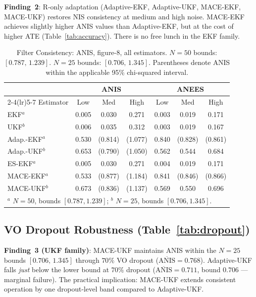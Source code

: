 \documentclass[letterpaper, 10pt, journal]{IEEEtran}
\begin{document}
\textbf{Finding~2}: R-only adaptation (Adaptive-EKF, Adaptive-UKF, MACE-EKF,
MACE-UKF) restores NIS consistency at medium and high noise. MACE-EKF achieves
slightly higher ANIS values than Adaptive-EKF, but at the cost of higher ATE
(Table~\ref{tab:accuracy}). There is no free lunch in the EKF family.

\begin{table}[t]
\caption{Filter Consistency: ANIS, figure-8, all estimators.
  $N=50$ bounds: $[0.787,\,1.239]$. $N=25$ bounds: $[0.706,\,1.345]$.
  Parentheses denote ANIS within the applicable 95\% chi-squared interval.}
\label{tab:consistency}
\centering\small
\begin{tabular}{lccc@{\quad}ccc}
\toprule
& \multicolumn{3}{c}{ANIS} & \multicolumn{3}{c}{ANEES}\\
\cmidrule(lr){2-4}\cmidrule(lr){5-7}
Estimator & Low & Med & High & Low & Med & High\\
\midrule
EKF$^a$          & 0.005 & 0.030 & 0.271 & 0.003 & 0.019 & 0.171\\
UKF$^b$          & 0.006 & 0.035 & 0.312 & 0.003 & 0.019 & 0.167\\
Adap.-EKF$^a$    & 0.530 & (0.814) & (1.077) & 0.840 & (0.828) & (0.861)\\
Adap.-UKF$^b$    & 0.653 & (0.790) & (1.050) & 0.562 & 0.544 & 0.684\\
ES-EKF$^a$       & 0.005 & 0.030 & 0.271 & 0.004 & 0.019 & 0.171\\
MACE-EKF$^a$     & 0.533 & (0.877) & (1.184) & 0.841 & (0.846) & (0.866)\\
MACE-UKF$^b$     & 0.673 & (0.836) & (1.137) & 0.569 & 0.550 & 0.696\\
\bottomrule
\multicolumn{7}{l}{\footnotesize $^a$ $N=50$, bounds $[0.787,1.239]$;\;
  $^b$ $N=25$, bounds $[0.706,1.345]$.}
\end{tabular}
\end{table}

\subsection{VO Dropout Robustness (Table~\ref{tab:dropout})}
\label{sec:dropout}

\textbf{Finding~3 (UKF family)}:
MACE-UKF maintains ANIS within the $N=25$ bounds $[0.706,\,1.345]$
through $70\%$ VO dropout ($\overline{\text{ANIS}}=0.768$).
Adaptive-UKF falls \emph{just} below the lower bound at $70\%$ dropout
($\overline{\text{ANIS}}=0.711$, bound $0.706$ --- marginal failure).
The practical implication: MACE-UKF extends consistent operation by
one dropout-level band compared to Adaptive-UKF.
\end{document}
